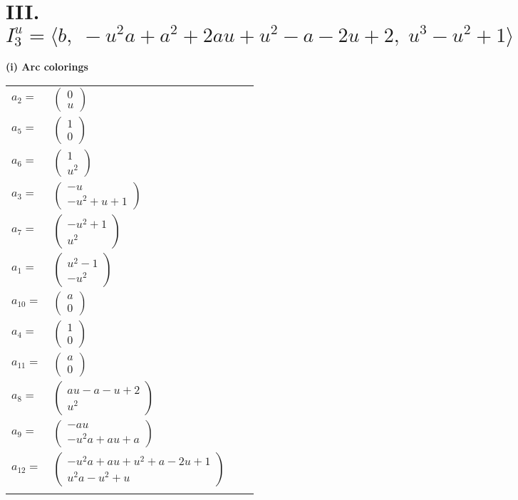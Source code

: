 \documentclass[1p]{elsarticle_modified}
\theoremstyle{definition}
\begin{document}
\centering \section*{III. $I^u_{3}= \langle b,\;- u^2 a+a^2+2 a u+u^2- a-2 u+2,\;u^3- u^2+1 \rangle$}
\flushleft \textbf{(i) Arc colorings}\\
\begin{tabular}{m{7pt} m{180pt} m{7pt} m{180pt} }
\flushright $a_{2}=$&$\begin{pmatrix}0\\u\end{pmatrix}$ \\
\flushright $a_{5}=$&$\begin{pmatrix}1\\0\end{pmatrix}$ \\
\flushright $a_{6}=$&$\begin{pmatrix}1\\u^2\end{pmatrix}$ \\
\flushright $a_{3}=$&$\begin{pmatrix}- u\\- u^2+u+1\end{pmatrix}$ \\
\flushright $a_{7}=$&$\begin{pmatrix}- u^2+1\\u^2\end{pmatrix}$ \\
\flushright $a_{1}=$&$\begin{pmatrix}u^2-1\\- u^2\end{pmatrix}$ \\
\flushright $a_{10}=$&$\begin{pmatrix}a\\0\end{pmatrix}$ \\
\flushright $a_{4}=$&$\begin{pmatrix}1\\0\end{pmatrix}$ \\
\flushright $a_{11}=$&$\begin{pmatrix}a\\0\end{pmatrix}$ \\
\flushright $a_{8}=$&$\begin{pmatrix}a u- a- u+2\\u^2\end{pmatrix}$ \\
\flushright $a_{9}=$&$\begin{pmatrix}- a u\\- u^2 a+a u+a\end{pmatrix}$ \\
\flushright $a_{12}=$&$\begin{pmatrix}- u^2 a+a u+u^2+a-2 u+1\\u^2 a- u^2+u\end{pmatrix}$\\&\end{tabular}
\end{document}
